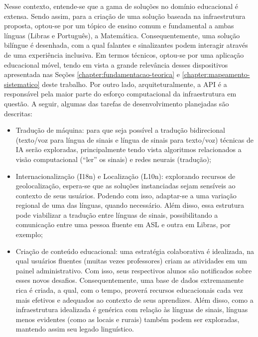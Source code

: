 Nesse contexto, entende-se que a gama de soluções no domínio educacional é extensa. Sendo assim, para a criação de uma solução baseada na infraestrutura proposta, optou-se por um tópico de ensino comum e fundamental a ambas línguas (Libras e Português), a Matemática. Consequentemente, uma solução bilíngue é desenhada, com a qual falantes e sinalizantes podem interagir através de uma experiência inclusiva. Em termos técnicos, optou-se por uma aplicação educacional móvel, tendo em vista a grande relevância desses dispositivos apresentada nas Seções \ref{chapter:fundamentacao-teorica} e \ref{chapter:mapeamento-sistematico} deste trabalho. Por outro lado, arquiteturalmente, a API é a responsável pela maior parte do esforço computacional da infraestrutura em questão. A seguir, algumas das tarefas de desenvolvimento planejadas são descritas:  %

\begin{itemize}
    \item Tradução de máquina: para que seja possível a tradução bidirecional (texto/voz para língua de sinais e língua de sinais para texto/voz) técnicas de IA serão exploradas, principalmente tendo vista algoritmos relacionados a visão computacional (``ler'' os sinais) e redes neurais (tradução);
    \item Internacionalização (I18n) e Localização (L10n): explorando recursos de geolocalização, espera-se que as soluções instanciadas sejam sensíveis ao contexto de seus usuários. Podendo com isso, adaptar-se a uma variação regional de uma das línguas, quando necessário. Além disso, essa estrutura pode viabilizar a tradução entre línguas de sinais, possibilitando a comunicação entre uma pessoa fluente em ASL e outra em Libras, por exemplo;
    \item Criação de conteúdo educacional: uma estratégia colaborativa é idealizada, na qual usuários fluentes (muitas vezes professores) criam as atividades em um painel administrativo. Com isso, seus respectivos alunos são notificados sobre esses novos desafios. Consequentemente, uma base de dados extremamente rica é criada, a qual, com o tempo, proverá recursos educacionais cada vez mais efetivos e adequados ao contexto de seus aprendizes. Além disso, como a infraestrutura idealizada é genérica com relação às línguas de sinais, línguas menos evidentes (como as locais e rurais) também podem ser exploradas, mantendo assim seu legado linguístico. %
\end{itemize}

